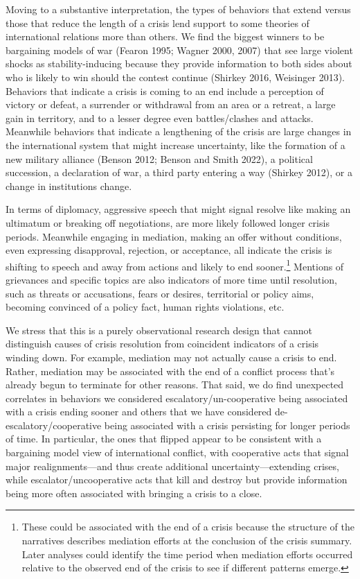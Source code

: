 \documentclass[
]{article}
\begin{document}
Moving to a substantive interpretation, the types of behaviors that
extend versus those that reduce the length of a crisis lend support to
some theories of international relations more than others. We find the
biggest winners to be bargaining models of war (Fearon 1995; Wagner
2000, 2007) that see large violent shocks as stability-inducing because
they provide information to both sides about who is likely to win should
the contest continue (Shirkey 2016, Weisinger 2013). Behaviors that
indicate a crisis is coming to an end include a perception of victory or
defeat, a surrender or withdrawal from an area or a retreat, a large
gain in territory, and to a lesser degree even battles/clashes and
attacks. Meanwhile behaviors that indicate a lengthening of the crisis
are large changes in the international system that might increase
uncertainty, like the formation of a new military alliance (Benson 2012;
Benson and Smith 2022), a political succession, a declaration of war, a
third party entering a way (Shirkey 2012), or a change in institutions
change.

In terms of diplomacy, aggressive speech that might signal resolve like
making an ultimatum or breaking off negotiations, are more likely
followed longer crisis periods. Meanwhile engaging in mediation, making
an offer without conditions, even expressing disapproval, rejection, or
acceptance, all indicate the crisis is shifting to speech and away from
actions and likely to end sooner.\footnote{These could be associated
  with the end of a crisis because the structure of the narratives
  describes mediation efforts at the conclusion of the crisis summary.
  Later analyses could identify the time period when mediation efforts
  occurred relative to the observed end of the crisis to see if
  different patterns emerge.} Mentions of grievances and specific topics
are also indicators of more time until resolution, such as threats or
accusations, fears or desires, territorial or policy aims, becoming
convinced of a policy fact, human rights violations, etc.

We stress that this is a purely observational research design that
cannot distinguish causes of crisis resolution from coincident
indicators of a crisis winding down. For example, mediation may not
actually cause a crisis to end. Rather, mediation may be associated with
the end of a conflict process that's already begun to terminate for
other reasons. That said, we do find unexpected correlates in behaviors
we considered escalatory/un-cooperative being associated with a crisis
ending sooner and others that we have considered
de-escalatory/cooperative being associated with a crisis persisting for
longer periods of time. In particular, the ones that flipped appear to
be consistent with a bargaining model view of international conflict,
with cooperative acts that signal major realignments---and thus create
additional uncertainty---extending crises, while escalator/uncooperative
acts that kill and destroy but provide information being more often
associated with bringing a crisis to a close.
\end{document}
